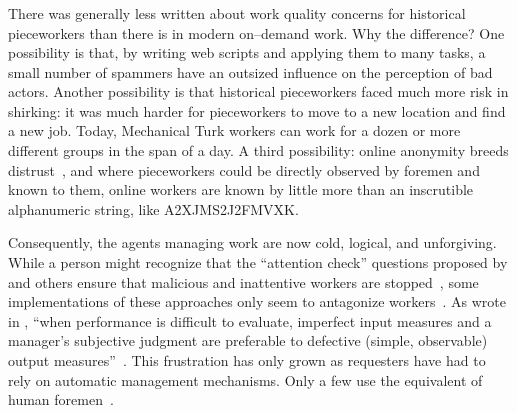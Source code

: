 \documentclass[pn4226]{subfiles}
\begin{document}
\subsubsection{\whatchanged}

\begin{comment}
	*workers make little money but love autonomy --- workers make little money
	workers blamed for quality --- ???
	both cases, sociality is hard
	*collective action hard --- collective action succeeded
	- algorithms, not managers
\end{comment}

There was generally less written about work quality concerns for historical pieceworkers than there is in modern on--demand work. 
Why the difference? 
One possibility is that, by writing web scripts and applying them to many tasks,
a small number of spammers have an outsized influence on the perception of bad actors.
Another possibility is that historical pieceworkers faced much more risk in shirking:
it was much harder for pieceworkers to move to a new location and find a new job.
Today, Mechanical Turk workers can work for a dozen or more different groups in the span of a day.
A third possibility: online anonymity breeds distrust~\cite{friedman2000trust}, and
where pieceworkers could be directly observed by foremen and known to them,
online workers are known by little more than an inscrutible alphanumeric string, like A2XJMS2J2FMVXK.



Consequently,
the agents managing work are now
cold, logical, and unforgiving.
While a person might recognize that the ``attention check'' questions
proposed by \citeauthor{le2010ensuring} and others ensure that
malicious and inattentive workers are stopped~\cite{le2010ensuring,AAAIW113995},
some implementations of these approaches
only seem to antagonize workers~\cite{takingAHITMcInnis}.
As \citeauthor{10.2307/2555446} wrote in \citeyear{10.2307/2555446},
``when performance is difficult to evaluate,
imperfect input measures and
a manager's subjective judgment are preferable to
defective (simple, observable) output measures''~\cite{10.2307/2555446}.
This frustration has only grown as requesters have had to rely on automatic management mechanisms.
Only a few use the equivalent of human foremen~\cite{haas2015argonaut,kulkarni2012mobileworks}.
\end{document}
